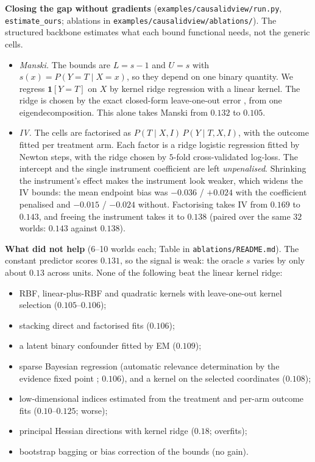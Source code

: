 \documentclass[11pt]{article}
\theoremstyle{definition}
\theoremstyle{remark}
\begin{document}
\textbf{Closing the gap without gradients} (\texttt{examples/causalidview/run.py}, \texttt{estimate\_ours}; ablations in \texttt{examples/causalidview/ablations/}). The structured backbone estimates what each bound functional needs, not the generic cells.
\begin{itemize}
  \item \emph{Manski.} The bounds are $L=s-1$ and $U=s$ with $s(x)=P(Y=T\mid X=x)$, so they depend on one binary quantity. We regress $\mathbf 1[Y=T]$ on $X$ by kernel ridge regression \cite{hoerlkennard70,saunders98} with a linear kernel. The ridge is chosen by the exact closed-form leave-one-out error \cite{allen74,golubheathwahba79}, from one eigendecomposition. This alone takes Manski from $0.132$ to $0.105$.
  \item \emph{IV.} The cells are factorised as $P(T\mid X,I)\,P(Y\mid T,X,I)$, with the outcome fitted per treatment arm. Each factor is a ridge logistic regression fitted by Newton steps, with the ridge chosen by $5$-fold cross-validated log-loss. The intercept and the single instrument coefficient are left \emph{unpenalised}. Shrinking the instrument's effect makes the instrument look weaker, which widens the IV bounds: the mean endpoint bias was $-0.036$ / $+0.024$ with the coefficient penalised and $-0.015$ / $-0.024$ without. Factorising takes IV from $0.169$ to $0.143$, and freeing the instrument takes it to $0.138$ (paired over the same $32$ worlds: $0.143$ against $0.138$).
\end{itemize}
\textbf{What did not help} (6--10 worlds each; Table in \texttt{ablations/README.md}). The constant predictor scores $0.131$, so the signal is weak: the oracle $s$ varies by only about $0.13$ across units. None of the following beat the linear kernel ridge:
\begin{itemize}
  \item RBF, linear-plus-RBF and quadratic kernels with leave-one-out kernel selection ($0.105$--$0.106$);
  \item stacking direct and factorised fits ($0.106$);
  \item a latent binary confounder fitted by EM ($0.109$);
  \item sparse Bayesian regression (automatic relevance determination by the evidence fixed point \cite{mackay92,tipping01}; $0.106$), and a kernel on the selected coordinates ($0.108$);
  \item low-dimensional indices estimated from the treatment and per-arm outcome fits ($0.10$--$0.125$; worse);
  \item principal Hessian directions \cite{li92} with kernel ridge ($0.18$; overfits);
  \item bootstrap bagging or bias correction of the bounds (no gain).
\end{itemize}
\end{document}
